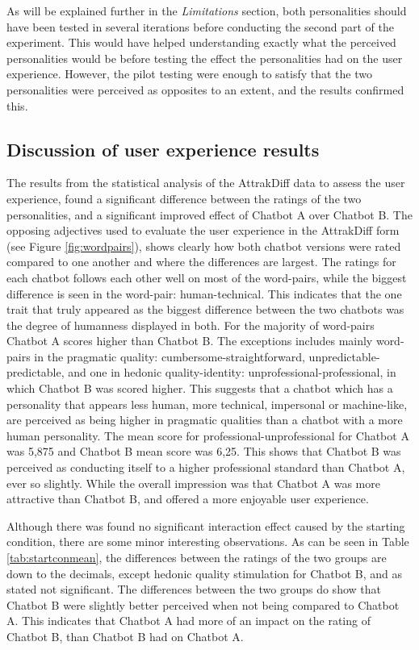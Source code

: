 As will be explained further in the \textit{Limitations} section, both personalities should have been tested in several iterations before conducting the second part of the experiment. This would have helped understanding exactly what the perceived personalities would be before testing the effect the personalities had on the user experience. However, the pilot testing were enough to satisfy that the two personalities were perceived as opposites to an extent, and the results confirmed this.

\vspace{2,5mm}

\subsection{Discussion of user experience results}

The results from the statistical analysis of the AttrakDiff data to assess the user experience, found a significant difference between the ratings of the two personalities, and a significant improved effect of Chatbot A over Chatbot B. The opposing adjectives used to evaluate the user experience in the AttrakDiff form (see Figure \ref{fig:wordpairs}), shows clearly how both chatbot versions were rated compared to one another and where the differences are largest. The ratings for each chatbot follows each other well on most of the word-pairs, while the biggest difference is seen in the word-pair: human-technical. This indicates that the one trait that truly appeared as the biggest difference between the two chatbots was the degree of humanness displayed in both. For the majority of word-pairs Chatbot A scores higher than Chatbot B. The exceptions includes mainly word-pairs in the pragmatic quality: cumbersome-straightforward, unpredictable-predictable, and one in hedonic quality-identity: unprofessional-professional, in which Chatbot B was scored higher. This suggests that a chatbot which has a personality that appears less human, more technical, impersonal or machine-like, are perceived as being higher in pragmatic qualities than a chatbot with a more human personality. The mean score for professional-unprofessional for Chatbot A was 5,875 and Chatbot B mean score was 6,25. This shows that Chatbot B was perceived as conducting itself to a higher professional standard than Chatbot A, ever so slightly. While the overall impression was that Chatbot A was more attractive than Chatbot B, and offered a more enjoyable user experience. 

Although there was found no significant interaction effect caused by the starting condition, there are some minor interesting observations. As can be seen in Table \ref{tab:startconmean}, the differences between the ratings of the two groups are down to the decimals, except hedonic quality stimulation for Chatbot B, and as stated not significant. The differences between the two groups do show that Chatbot B were slightly better perceived when not being compared to Chatbot A. This indicates that Chatbot A had more of an impact on the rating of Chatbot B, than Chatbot B had on Chatbot A.

